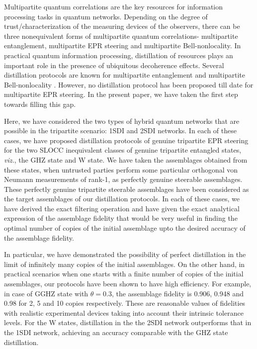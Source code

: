 \documentclass[reprint,superscriptaddress,nofootinbib,amsmath,amssymb,aps,pra,longbibliography]{revtex4-1}
\begin{document}
Multipartite quantum correlations are the key resources for   information processing tasks in  quantum networks. Depending on the degree of trust/characterization of the measuring devices of the observers, there can be three nonequivalent forms of multipartite quantum correlations- multipartite entanglement, multipartite EPR steering and multipartite Bell-nonlocality. In practical quantum information processing, distillation of resources plays an important role in the presence of ubiquitous decoherence effects. Several distillation protocols are known for  multipartite entanglement \cite{Huang14,Ben08} and  multipartite Bell-nonlocality \cite{Wu10,Ye12,Ebbe2013,Pan2015}. However, no distillation protocol has been proposed till date for multipartite EPR steering. In the present paper, we have taken the first step towards filling this gap. 

Here, we have considered the two types of hybrid quantum networks that are possible in the tripartite scenario: 1SDI and 2SDI networks. In each of these cases, we have proposed distillation protocols of genuine tripartite EPR steering for the two SLOCC inequivalent classes of genuine tripartite entangled states, {\it viz.}, the GHZ  state and W  state. We have taken the assemblages obtained from these states, when untrusted parties perform some particular orthogonal von Neumann measurements of rank-1, as  perfectly genuine steerable assemblages. These perfectly genuine tripartite steerable assemblages have been considered as the target assemblages of our distillation protocols. In each of these cases, we have derived the exact filtering operation and have given the exact analytical expression of the assemblage fidelity  that would be very useful in finding the optimal number of copies of the initial assemblage upto the desired accuracy of the assemblage fidelity.

In particular, we have demonstrated the  possibility of perfect distillation in the limit of infinitely many copies of the initial assemblages. On the other hand, in practical scenarios  when one starts with a finite number of copies of the initial assemblages, our protocols have been shown to have high efficiency. For example, in case of GGHZ state with $\theta = 0.3$, the assemblage fidelity is 0.906, 0.948 and 0.98 for 2, 5 and 10 copies respectively. These are reasonable values of fidelities with realistic experimental devices taking into account their intrinsic tolerance levels. For the W states, distillation in the the 2SDI network outperforms that in the 1SDI network, achieving an accuracy comparable with the GHZ state distillation. 
\end{document}
